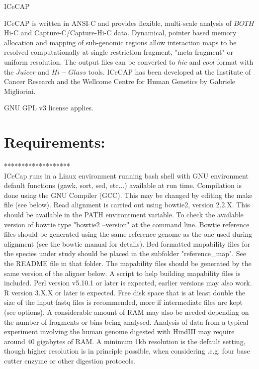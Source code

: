 \documentclass[10pt,a4paper]{article}
\begin{document}
\hspace*{1cm} 
{\huge ICeCAP} 
\vspace*{2cm}

ICeCAP is written in ANSI-C and provides flexible, multi-scale analysis of $BOTH$ Hi-C and Capture-C/Capture-Hi-C data. Dynamical, pointer based memory allocation and mapping of sub-genomic regions allow interaction maps to be resolved computationally at single restriction fragment, "meta-fragment" or uniform resolution.
The output files can be converted to $hic$ and $cool$ format with the $Juicer$ and $Hi-Glass$ tools.
ICeCAP has been developed at the Institute of Cancer Research and the Wellcome Centre for Human Genetics by Gabriele Migliorini.

GNU GPL v3 license applies.\\

\section*{Requirements:}
*******************\\
ICeCap runs in a Linux environment running bash shell with GNU environment default functions (gawk, sort, sed, etc...) available at run time.
Compilation is done using the GNU Compiler (GCC).  This may be changed by editing the make file (see below).
Read alignment is carried out using bowtie2, version 2.2.X.  This should be available in the PATH environtment variable.  To check the available version of bowtie type "bowtie2 --version" at the command line.
Bowtie reference files should be generated using the same reference genome as the one used during alignment (see the bowtie manual for details).
Bed formatted mapability files for the species under study should be placed in the subfolder "reference\_map". See the README file in that folder.
The mapability files should be generated by the same version of the aligner below. A script to help building mapability files is included.
Perl version v5.10.1 or later is expected, earlier versions may also work.
R version 3.X.X or later is expected.
Free disk space that is at least double the size of the input fastq files is recommended, more if intermediate files are kept (see options).
A considerable amount of RAM may also be needed depending on the number of fragments or bins being analysed.  Analysis of data from a typical experiment involving the human genome digested with HindIII may require around 40 gigabytes of RAM. A minimum 1kb resolution is the default setting, though higher resolution is in principle possible, when considering .e.g. four base cutter enzyme or other digestion protocols.
\end{document}
